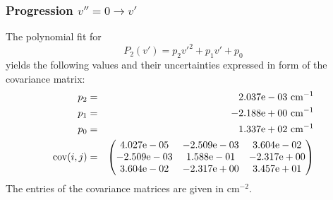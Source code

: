 \subsubsection{Progression $v'' = 0 \rightarrow v'$}
The polynomial fit for 
\begin{equation}
    P_2(v') = p_2 {v'}^2 + p_1 v' + p_0
\end{equation}
yields the following values and their uncertainties expressed in form of 
the covariance matrix:
\begin{eqnarray}
    p_2 &=& 2.037\mathrm{e}-03 \ \mathrm{cm^{-1}}\\
    p_1 &=& -2.188\mathrm{e}+00 \ \mathrm{cm^{-1}}\\
    p_0 &=& 1.337\mathrm{e}+02 \ \mathrm{cm^{-1}}\\
    \mathrm{cov}(i, j) &=& 
    \begin{pmatrix}
        4.027\mathrm{e}-05 &-2.509\mathrm{e}-03 &3.604\mathrm{e}-02 \\
        -2.509\mathrm{e}-03 &1.588\mathrm{e}-01 &-2.317\mathrm{e}+00 \\
        3.604\mathrm{e}-02 &-2.317\mathrm{e}+00 &3.457\mathrm{e}+01 \\
    \end{pmatrix}
\end{eqnarray}
The entries of the covariance 
matrices are given in $\mathrm{cm^{-2}}$.

